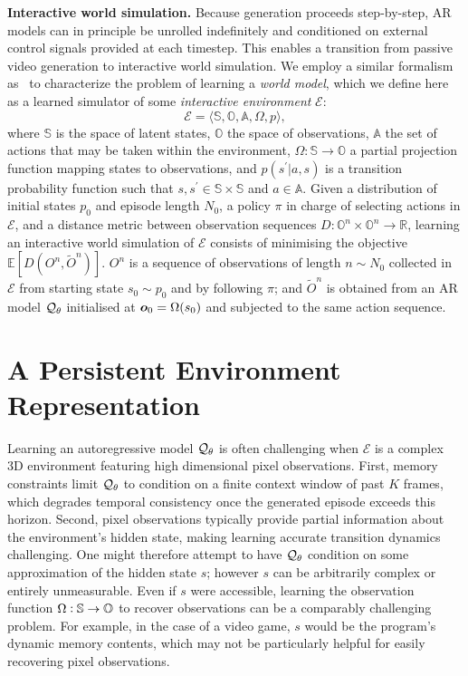 \documentclass{article}
\theoremstyle{plain}
\theoremstyle{definition}
\theoremstyle{remark}
\begin{document}
\textbf{Interactive world simulation.} Because generation proceeds step-by-step, AR models can in principle be unrolled indefinitely and conditioned on external control signals provided at each timestep.
This enables a transition from passive video generation to interactive world simulation. We employ a similar formalism as~\citet{valevski2024diffusionmodelsrealtimegame} to characterize the problem of learning a \textit{world model}, which we define here as a learned simulator of some \textit{interactive environment} $\mathcal{E}$:
\begin{equation}
    \mathcal{E} = \langle \mathbb{S} , \mathbb{O}, \mathbb{A}, \Omega, p\rangle,
\end{equation}
 where $\mathbb{S}$ is the space of latent states, $\mathbb{O}$ the space of observations, $\mathbb{A}$ the set of actions that may be taken within the environment, $\Omega : \mathbb{S} \rightarrow \mathbb{O}$ a partial projection function mapping states to observations, and $p(s^\prime|a,s)$ is a transition probability function such that $s,s^\prime \in \mathbb{S}\times\mathbb{S}$ and $a \in \mathbb{A}$. 
Given a distribution of initial states $p_0$ and episode length $N_0$, a policy $\pi$ in charge of selecting actions in $\mathcal{E}$, and a distance metric between observation sequences $D : \mathbb{O}^n \times \mathbb{O}^n \rightarrow \mathbb{R}$, learning an interactive world simulation of $\mathcal{E}$ consists of minimising the objective $\mathbb{E}[D(O^n, \tilde{O}^n)]$. $O^n$ is a sequence of observations of length $n\sim N_0$ collected in $\mathcal{E}$ from starting state $s_0\sim p_0$ and by following $\pi$; and $\tilde{O}^n$ is obtained from an AR model ${\mathcal{Q}}_\theta$ initialised at ${\bm{o}}_0 = \Omega(s_0)$ and subjected to the same action sequence.

\vspace{-0.2cm}
\section{A Persistent Environment Representation}
Learning an autoregressive model ${\mathcal{Q}}_\theta$ is often challenging when $\mathcal{E}$ is a complex 3D environment featuring high dimensional pixel observations.
First, memory constraints limit ${\mathcal{Q}}_\theta$ to condition on a finite context window of past $K$ frames, which degrades temporal consistency once the generated episode exceeds this horizon. 
Second, pixel observations typically provide partial information about the environment's hidden state, making learning accurate transition dynamics challenging.
One might therefore attempt to have ${\mathcal{Q}}_\theta$ condition on some approximation of the hidden state $s$; however $s$ can be arbitrarily complex or entirely unmeasurable. Even if $s$ were accessible, learning the observation function $\Omega : {\mathbb{S}} \rightarrow {\mathbb{O}} $ to recover observations can be a comparably challenging problem. For example, in the case of a video game, $s$ would be the program's dynamic memory contents, which may not be particularly helpful for easily recovering pixel observations. 
\end{document}
